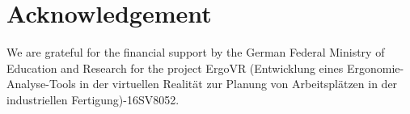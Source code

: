 \section*{Acknowledgement}
We are grateful for the financial support by the German Federal Ministry of Education and Research for the project ErgoVR (Entwicklung eines Ergonomie-Analyse-Tools in der virtuellen Realität zur Planung von Arbeitsplätzen in der industriellen Fertigung)-16SV8052. 


